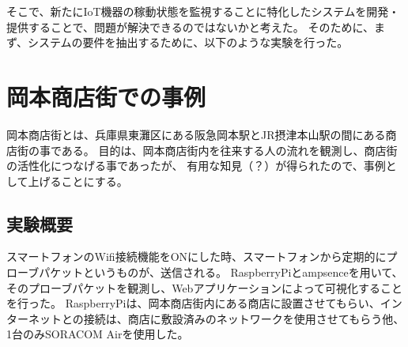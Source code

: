そこで、新たにIoT機器の稼動状態を監視することに特化したシステムを開発・提供することで、問題が解決できるのではないかと考えた。
そのために、まず、システムの要件を抽出するために、以下のような実験を行った。

\section{岡本商店街での事例}
岡本商店街とは、兵庫県東灘区にある阪急岡本駅とJR摂津本山駅の間にある商店街の事である。
目的は、岡本商店街内を往来する人の流れを観測し、商店街の活性化につなげる事であったが、
有用な知見（？）が得られたので、事例として上げることにする。

\subsection{実験概要}
スマートフォンのWifi接続機能をONにした時、スマートフォンから定期的にプローブパケットというものが、送信される。
RaspberryPiとampsenceを用いて、そのプローブパケットを観測し、Webアプリケーションによって可視化することを行った。
RaspberryPiは、岡本商店街内にある商店に設置させてもらい、インターネットとの接続は、商店に敷設済みのネットワークを使用させてもらう他、1台のみSORACOM Airを使用した。

